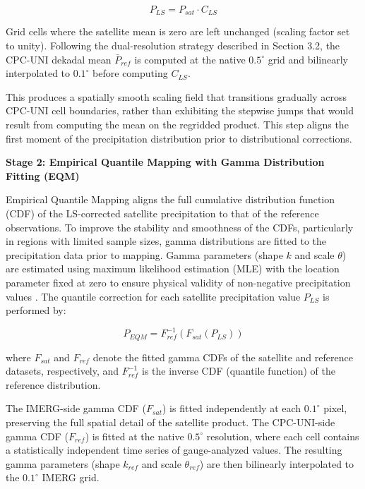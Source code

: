 \documentclass[11pt,a4paper]{article}
\begin{document}
\begin{equation}P_{LS} = P_{sat} \cdot C_{LS}\end{equation}

Grid cells where the satellite mean is zero are left unchanged (scaling
factor set to unity). Following the dual-resolution strategy described
in Section 3.2, the CPC-UNI dekadal mean \(\bar{P}_{ref}\) is computed
at the native \(0.5^{\circ}\) grid and bilinearly interpolated to
\(0.1^{\circ}\) before computing \(C_{LS}\).

This produces a spatially smooth scaling field that transitions
gradually across CPC-UNI cell boundaries, rather than exhibiting the
stepwise jumps that would result from computing the mean on the
regridded product. This step aligns the first moment of the
precipitation distribution prior to distributional corrections.

\textbf{Stage 2: Empirical Quantile Mapping with Gamma Distribution
Fitting (EQM)}

Empirical Quantile Mapping aligns the full cumulative distribution
function (CDF) of the LS-corrected satellite precipitation to that of
the reference observations. To improve the stability and smoothness of
the CDFs, particularly in regions with limited sample sizes, gamma
distributions are fitted to the precipitation data prior to mapping.
Gamma parameters (shape \(k\) and scale \(\theta\)) are estimated using
maximum likelihood estimation (MLE) with the location parameter fixed at
zero to ensure physical validity of non-negative precipitation values
\cite{ref15}. The quantile correction for each satellite precipitation value
\(P_{LS}\) is performed by:

\begin{equation}P_{EQM} = F_{ref}^{-1}\left( F_{sat}\left( P_{LS} \right) \right)\end{equation}

where \(F_{sat}\) and \(F_{ref}\) denote the fitted gamma CDFs of the
satellite and reference datasets, respectively, and \(F_{ref}^{-1}\) is
the inverse CDF (quantile function) of the reference distribution.

The IMERG-side gamma CDF (\(F_{sat}\)) is fitted independently at each
\(0.1^{\circ}\) pixel, preserving the full spatial detail of the
satellite product. The CPC-UNI-side gamma CDF (\(F_{ref}\)) is fitted at
the native \(0.5^{\circ}\) resolution, where each cell contains a
statistically independent time series of gauge-analyzed values. The
resulting gamma parameters (shape \(k_{ref}\) and scale
\(\theta_{ref}\)) are then bilinearly interpolated to the
\(0.1^{\circ}\) IMERG grid.
\end{document}
